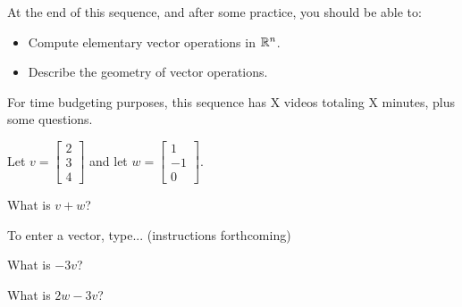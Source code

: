 







At the end of this sequence, and after some practice, you should be able to:

\begin{itemize}
\item Compute elementary vector operations in $\mathbb R^n$.  
\item Describe the geometry of vector operations.
\end{itemize}


For time budgeting purposes, this sequence has X videos totaling X minutes, 
plus some questions.  




\endedxtext

\endedxvertical









Let $v = \left[\begin{array}{c} 2 \\ 3  \\ 4 \end{array} \right]$ and let 
$w = \left[\begin{array}{c} 1 \\ -1  \\ 0 \end{array} \right].$


What is $v+w$?  

To enter a vector, type... (instructions forthcoming)





What is $-3v$?  




What is $2w-3v$?  





